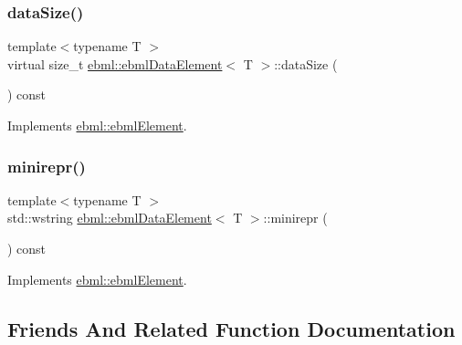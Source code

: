 \subsubsection{\texorpdfstring{data\+Size()}{dataSize()}}
{\footnotesize\ttfamily template$<$typename T $>$ \\
virtual size\+\_\+t \mbox{\hyperlink{classebml_1_1ebmlDataElement}{ebml\+::ebml\+Data\+Element}}$<$ T $>$\+::data\+Size (\begin{DoxyParamCaption}{ }\end{DoxyParamCaption}) const\hspace{0.3cm}{\ttfamily [virtual]}}



Implements \mbox{\hyperlink{classebml_1_1ebmlElement_a47ed4167d9c69104e02b6dbad0cd1fef}{ebml\+::ebml\+Element}}.

\mbox{\label{classebml_1_1ebmlDataElement_a721eb3bfcb545510f2cebad65776f1bd}} 
\subsubsection{\texorpdfstring{minirepr()}{minirepr()}}
{\footnotesize\ttfamily template$<$typename T $>$ \\
std\+::wstring \mbox{\hyperlink{classebml_1_1ebmlDataElement}{ebml\+::ebml\+Data\+Element}}$<$ T $>$\+::minirepr (\begin{DoxyParamCaption}{ }\end{DoxyParamCaption}) const\hspace{0.3cm}{\ttfamily [virtual]}}



Implements \mbox{\hyperlink{classebml_1_1ebmlElement_a7852173aeef78bd843939ae5a82f1d1c}{ebml\+::ebml\+Element}}.



\subsection{Friends And Related Function Documentation}
\mbox{\label{classebml_1_1ebmlDataElement_ae0bbbe5e14590a39747036bca3911c95}} 
